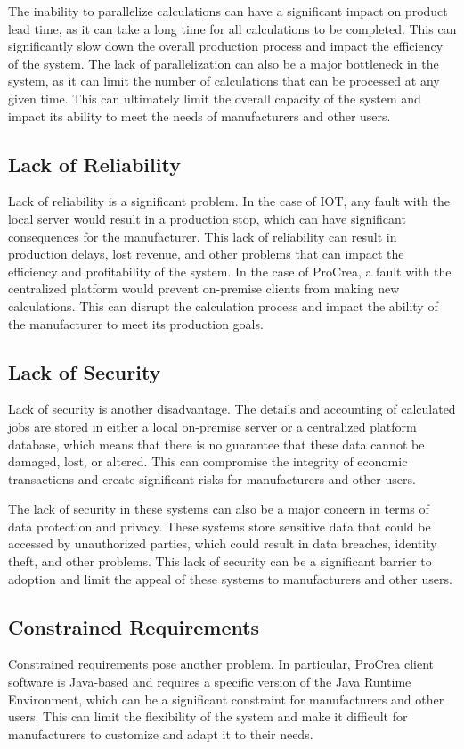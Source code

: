 \documentclass[10pt,a4paper]{report}
\begin{document}
\large\justify The inability to parallelize calculations can have a significant impact on product lead time, as it can take a long time for all calculations to be completed. This can significantly slow down the overall production process and impact the efficiency of the system. The lack of parallelization can also be a major bottleneck in the system, as it can limit the number of calculations that can be processed at any given time. This can ultimately limit the overall capacity of the system and impact its ability to meet the needs of manufacturers and other users.

\subsection{Lack of Reliability}
\large\justify Lack of reliability is a significant problem. In the case of IOT, any fault with the local server would result in a production stop, which can have significant consequences for the manufacturer. This lack of reliability can result in production delays, lost revenue, and other problems that can impact the efficiency and profitability of the system. In the case of ProCrea, a fault with the centralized platform would prevent on-premise clients from making new calculations. This can disrupt the calculation process and impact the ability of the manufacturer to meet its production goals.

\subsection{Lack of Security}
\large\justify Lack of security is another disadvantage. The details and accounting of calculated jobs are stored in either a local on-premise server or a centralized platform database, which means that there is no guarantee that these data cannot be damaged, lost, or altered. This can compromise the integrity of economic transactions and create significant risks for manufacturers and other users.

\large\justify The lack of security in these systems can also be a major concern in terms of data protection and privacy. These systems store sensitive data that could be accessed by unauthorized parties, which could result in data breaches, identity theft, and other problems. This lack of security can be a significant barrier to adoption and limit the appeal of these systems to manufacturers and other users.

\subsection{Constrained Requirements}
\large\justify Constrained requirements pose another problem. In particular, ProCrea client software is Java-based and requires a specific version of the Java Runtime Environment, which can be a significant constraint for manufacturers and other users. This can limit the flexibility of the system and make it difficult for manufacturers to customize and adapt it to their needs.
\end{document}
